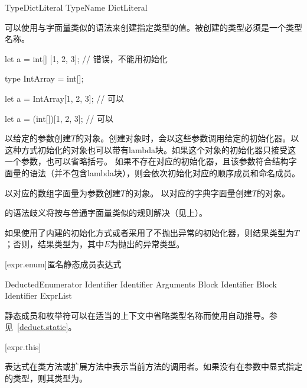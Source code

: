 \begin{bnf}{TypeDictLiteral}
    TypeName DictLiteral
\end{bnf}

\pnum
可以使用与字面量类似的语法来创建指定类型的值。被创建的类型必须是一个类型名称。

\enterexample
\begin{codeblock}

let a = int[] [1, 2, 3]; // 错误，不能用\tcode{[]}初始化

type IntArray = int[];

let a = IntArray[1, 2, 3]; // 可以

let a = (int[])[1, 2, 3]; // 可以

\end{codeblock}
\exitexample

\pnum
{}以给定的参数创建$T$的对象。创建对象时，会以这些参数调用给定的初始化器。以这种方式初始化的对象也可以带有lambda块。如果这个对象的初始化器只接受这一个参数，也可以省略括号。
如果不存在对应的初始化器，且该参数符合结构字面量的语法（并不包含lambda块），则会依次初始化对应的顺序成员和命名成员。

\pnum
{}以对应的数组字面量为参数创建$T$的对象。
以对应的字典字面量创建$T$的对象。

\pnum
{}的语法歧义将按与普通字面量类似的规则解决（见上）。

\pnum
如果使用了内建的初始化方式或者采用了不抛出异常的初始化器，则结果类型为$T$；否则，结果类型为，其中$E$为抛出的异常类型。

[expr.enum]{匿名静态成员表达式}

\begin{bnf}{DeductedEnumerator}
     Identifier \br
     Identifier \terminal{(} Arguments\bnfq \terminal{)} Block\bnfs \br
     Identifier Block \br
     Identifier \terminal{[} ExprList\bnfq \terminal{]}
\end{bnf}

\pnum
静态成员和枚举符可以在适当的上下文中省略类型名称而使用自动推导。参见~\ref{deduct.static}。

[expr.this]{}

\pnum
表达式在类方法或扩展方法中表示当前方法的调用者。如果没有在参数中显式指定的类型，则其类型为。

